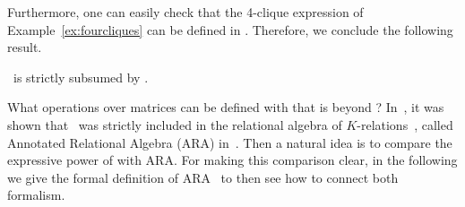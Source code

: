 Furthermore, one can easily check that the 4-clique expression of Example~\ref{ex:fourcliques} can be defined in \langsum. Therefore, we conclude the following result. 
\begin{corollary}
\lang\ is strictly subsumed by \langsum.
\end{corollary}

%
%
%

What operations over matrices can be defined with \langsum that is beyond \lang? In~\cite{brijder2019matrices}, it was shown that \lang\ was strictly included in the relational algebra of $K$-relations~\cite{GreenKT07}, called Annotated Relational Algebra (ARA) in~\cite{brijder2019matrices}.
Then a natural idea is to compare the expressive power of \langsum with ARA. For making this comparison clear, in the following we give the formal definition of ARA~\cite{GreenKT07} to then see how to connect both formalism.

